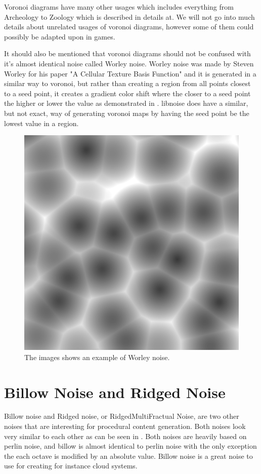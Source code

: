 Voronoi diagrams have many other usages which includes everything from Archeology to Zoology which is described in details at\cite{VoronoiDiagrams:Applications}. We will not go into much details about unrelated usages of voronoi diagrams, however some of them could possibly be adapted upon in games. 

It should also be mentioned that voronoi diagrams should not be confused with it's almost identical noise called Worley noise. Worley noise was made by Steven Worley for his paper "A Cellular Texture Basis Function" \cite{worley} and it is generated in a similar way to voronoi, but rather than creating a region from all points closest to a seed point, it creates a gradient color shift where the closer to a seed point the higher or lower the value as demonstrated in . libnoise does have a similar, but not exact, way of generating voronoi maps by having the seed point be the lowest value in a region.

\begin{figure}[H]
	\centering
	\includegraphics[width=0.5\linewidth]{img/worley_noise}
	\caption{The images shows an example of Worley noise.}
	\label{fig:worleynoise}
\end{figure}


\section{Billow Noise and Ridged Noise}
\label{brnoise}
Billow noise and Ridged noise, or RidgedMultiFractual Noise, are two other noises that are interesting for procedural content generation. Both noises look very similar to each other as can be seen in . Both noises are heavily based on perlin noise, and billow is almost identical to perlin noise with the only exception the each octave is modified by an absolute value\cite{libnoiseBillow}\cite{NoiseMachineMakingNoise}. Billow noise is a great noise to use for creating for instance cloud systems.

